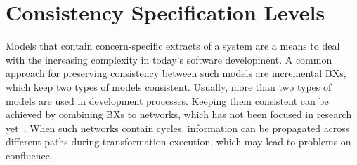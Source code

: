 \chapter{Consistency Specification Levels}

Models that contain concern-specific extracts of a system are a means to deal with the increasing complexity in today's software development. %
A common approach for preserving consistency between %
such models are incremental \acp{BX}, which %
keep two types of models consistent.
Usually, more than two types of models are used in development processes. %
Keeping them consistent can be achieved by combining \acp{BX} to networks, which has not been focused in research yet~\cite{stevens2017a}.
When such networks contain cycles, %
information can be propagated across different paths during transformation execution, which may lead to problems on confluence.


